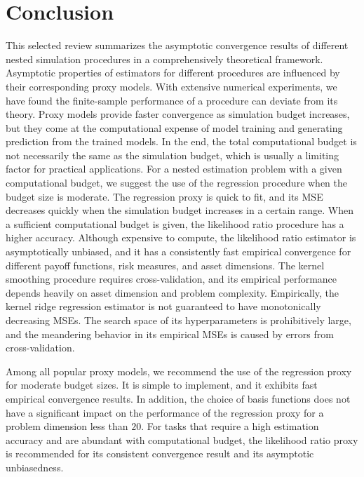 \documentclass{article}
\begin{document}
\section{Conclusion} \label{sec:conclusion}
This selected review summarizes the asymptotic convergence results of different nested simulation procedures in a comprehensively theoretical framework.
Asymptotic properties of estimators for different procedures are influenced by their corresponding proxy models.
With extensive numerical experiments, we have found the finite-sample performance of a procedure can deviate from its theory. 
Proxy models provide faster convergence as simulation budget increases, but they come at the computational expense of model training and generating prediction from the trained models. 
In the end, the total computational budget is not necessarily the same as the simulation budget, which is usually a limiting factor for practical applications.
For a nested estimation problem with a given computational budget, we suggest the use of the regression procedure when the budget size is moderate. 
The regression proxy is quick to fit, and its MSE decreases quickly when the simulation budget increases in a certain range. 
When a sufficient computational budget is given, the likelihood ratio procedure has a higher accuracy. 
Although expensive to compute, the likelihood ratio estimator is asymptotically unbiased, and it has a consistently fast empirical convergence for different payoff functions, risk measures, and asset dimensions.
The kernel smoothing procedure requires cross-validation, and its empirical performance depends heavily on asset dimension and problem complexity. 
Empirically, the kernel ridge regression estimator is not guaranteed to have monotonically decreasing MSEs. 
The search space of its hyperparameters is prohibitively large, and the meandering behavior in its empirical MSEs is caused by errors from cross-validation. 

Among all popular proxy models, we recommend the use of the regression proxy for moderate budget sizes. 
It is simple to implement, and it exhibits fast empirical convergence results. 
In addition, the choice of basis functions does not have a significant impact on the performance of the regression proxy for a problem dimension less than $20$.
For tasks that require a high estimation accuracy and are abundant with computational budget, the likelihood ratio proxy is recommended for its consistent convergence result and its asymptotic unbiasedness. 


\newpage


\end{document}
